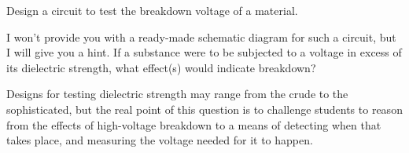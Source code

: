 

Design a circuit to test the breakdown voltage of a material.







I won't provide you with a ready-made schematic diagram for such a circuit, but I will give you a hint.  If a substance were to be subjected to a voltage in excess of its dielectric strength, what effect(s) would indicate breakdown?







Designs for testing dielectric strength may range from the crude to the sophisticated, but the real point of this question is to challenge students to reason from the effects of high-voltage breakdown to a means of detecting when that takes place, and measuring the voltage needed for it to happen.




